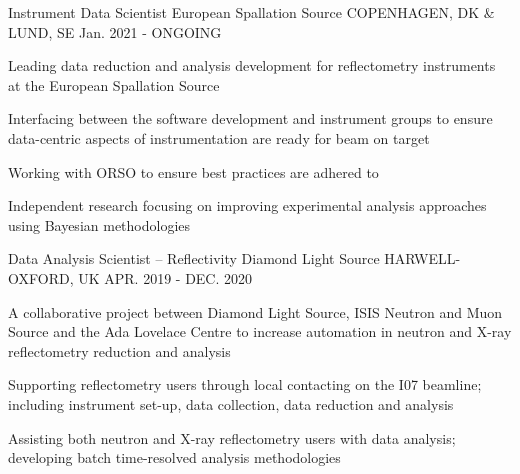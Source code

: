 \begin{cventries}
  \cventry
    {Instrument Data Scientist}
    {European Spallation Source}
    {COPENHAGEN, DK \& LUND, SE}
    {Jan. 2021 - ONGOING}
    {
      \begin{cvitems}
        \item {Leading data reduction and analysis development for reflectometry instruments at the European Spallation Source}
        \item {Interfacing between the software development and instrument groups to ensure data-centric aspects of instrumentation are ready for beam on target}
        \item {Working with ORSO to ensure best practices are adhered to}
        \item {Independent research focusing on improving experimental analysis approaches using Bayesian methodologies}
      \end{cvitems}
    }
  \cventry
    {Data Analysis Scientist -- Reflectivity}
    {Diamond Light Source}
    {HARWELL-OXFORD, UK}
    {APR. 2019 - DEC. 2020}
    {
      \begin{cvitems}
        \item {A collaborative project between Diamond Light Source, ISIS Neutron and Muon Source and the Ada Lovelace Centre to increase automation in neutron and X-ray reflectometry reduction and analysis}
        \item {Supporting reflectometry users through local contacting on the I07 beamline; including instrument set-up, data collection, data reduction and analysis}
        \item {Assisting both neutron and X-ray reflectometry users with data analysis; developing batch time-resolved analysis methodologies}
      \end{cvitems}
    }
\end{cventries}
